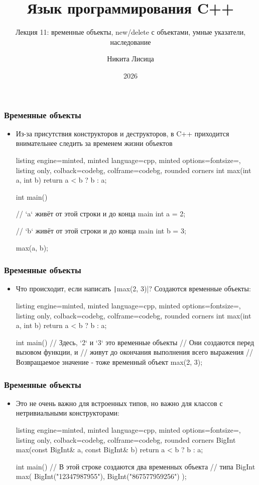 \documentclass[10pt]{beamer}
\title{Язык программирования C++}
\subtitle{Лекция 11: временные объекты, new/delete с объектами, умные указатели, наследование}
\date{2026}
\author{Никита Лисица}
\begin{document}
\frame{\titlepage}

\begin{frame}[fragile]
\frametitle{Временные объекты}
\begin{itemize}
\item Из-за присутствия конструкторов и деструкторов, в C++ приходится внимательнее следить за временем жизни объектов
\pause
{}
\begin{tcblisting}{listing engine=minted, minted language=cpp, minted options={fontsize=\scriptsize}, listing only, colback=codebg, colframe=codebg, rounded corners}
int max(int a, int b) {
  return a < b ? b : a;
}

int main() {
  // `a` живёт от этой строки и до конца main
  int a = 2;

  // `b` живёт от этой строки и до конца main
  int b = 3;

  max(a, b);
}
\end{tcblisting}
\end{itemize}
\end{frame}

\begin{frame}[fragile]
\frametitle{Временные объекты}
\begin{itemize}
\item Что происходит, если написать \texttt|max(2, 3)|? \pause Создаются временные объекты:
\pause
{}
\begin{tcblisting}{listing engine=minted, minted language=cpp, minted options={fontsize=\scriptsize}, listing only, colback=codebg, colframe=codebg, rounded corners}
int max(int a, int b) {
  return a < b ? b : a;
}

int main() {
  // Здесь, `2` и `3` это временные объекты
  // Они создаются перед вызовом функции, и
  // живут до окончания выполнения всего выражения
  // Возвращаемое значение - тоже временный объект
  max(2, 3);
}
\end{tcblisting}
\end{itemize}
\end{frame}

\begin{frame}[fragile]
\frametitle{Временные объекты}
\begin{itemize}
\item Это не очень важно для встроенных типов, но важно для классов с нетривиальными конструкторами:
\pause
{}
\begin{tcblisting}{listing engine=minted, minted language=cpp, minted options={fontsize=\scriptsize}, listing only, colback=codebg, colframe=codebg, rounded corners}
BigInt max(const BigInt& a, const BigInt& b) {
  return a < b ? b : a;
}

int main() {
  // В этой строке создаются два временных объекта
  // типа BigInt
  max(
    BigInt("12347987955"),
    BigInt("867577959256")
  );
}
\end{tcblisting}
\end{itemize}
\end{frame}
\end{document}
